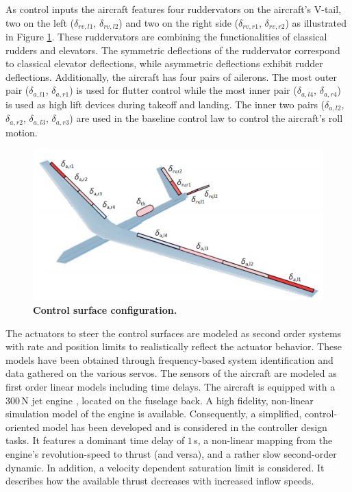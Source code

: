 \documentclass[aerospace,article,submit,moreauthors,pdftex,10pt,a4paper]{Definitions/mdpi}
\begin{document}
As control inputs the aircraft features four ruddervators on the aircraft's V-tail, two on the left ($\delta_{rv,l1}$, $\delta_{rv,l2}$) and two on the right side ($\delta_{rv,r1}$, $\delta_{rv,r2}$) as illustrated in Figure \ref{fig:ac_u}.  These ruddervators are combining the functionalities of classical rudders and elevators. The symmetric deflections of the ruddervator correspond to classical elevator deflections, while asymmetric deflections exhibit rudder deflections. Additionally, the aircraft has four pairs of ailerons. The most outer pair ($\delta_{a,l1}$, $\delta_{a,r1}$) is used for flutter control while the most inner pair ($\delta_{a,l4}$, $\delta_{a,r4}$) is used as high lift devices during takeoff and landing. The inner two pairs ($\delta_{a,l2}$, $\delta_{a,r2}$, $\delta_{a,l3}$, $\delta_{a,r3}$) are used in the baseline control law to control the aircraft's roll motion. 
 \begin{figure}
	\centering
	\includegraphics[width=1\linewidth]{figs/ac_u.jpg}
	\caption{\textbf{Control surface configuration.}}
	\label{fig:ac_u}
\end{figure}
 The actuators to steer the control surfaces are modeled as second order systems with rate and position limits to realistically reflect the actuator behavior. 
 These  models have been obtained through frequency-based system identification and data gathered on the various servos. The sensors of the aircraft are modeled as first order linear models including time delays.
 The aircraft is equipped with a 300\,N jet engine \cite{Sendner17}, located on the fuselage back.  A high fidelity, non-linear simulation model of the engine is available. Consequently, a simplified, control-oriented model has been developed and is considered in the controller design tasks. It features a dominant time delay of $1\,$s, a non-linear mapping from the engine's revolution-speed  to thrust  (and versa), and a rather slow second-order dynamic. In addition, a velocity dependent saturation limit is considered. It describes how the available thrust decreases with increased inflow speeds. 
\end{document}
